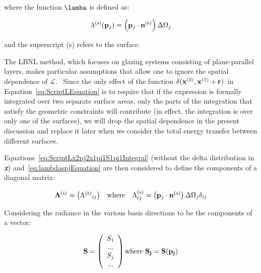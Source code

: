 where the function \(\lamba\) is defined as:

\begin{equation}
{\lambda ^{{\rm{(s)}}}}({{\bf{p}}_j}) = \left( {{{\bf{p}}_j}\cdot {{\bf{n}}^{{\rm{(s)}}}}} \right)\Delta {\Omega_j}
\label{eq:lambdaspjEquation}
\end{equation}

and the superscript (s) refers to the surface.

The LBNL method, which focuses on glazing systems consisting of plane-parallel layers, makes particular assumptions that allow one to ignore the spatial dependence of $\mathcal{L}$.~ Since the only effect of the function \(\delta ({{\bf{x}}^{{\rm{(2)}}}},{{\bf{x}}^{{\rm{(1)}}}} + {\bf{r}})\)~in Equation~\ref{eq:ScriptLEquation} is to require that if the expression is formally integrated over two separate surface areas, only the parts of the integration that satisfy the geometric constraints will contribute (in effect, the integration is over only one of the surfaces), we will drop the spatial dependence in the present discussion and replace it later when we consider the total energy transfer between different surfaces.

Equations~\ref{eq:ScriptLx2pj2x1pi1S1pi1Integral} (without the delta distribution in \textbf{\emph{x}}) and~\ref{eq:lambdaspjEquation} are then considered to define the components of a diagonal matrix:

\begin{equation}
\begin{array}{*{20}{c}}{{\bf{\Lambda }^{{\rm{(s)}}}} = \left( {{\Lambda ^{{\rm{(s)}}}}_{ij}} \right)}&{{\rm{where}}}&{\Lambda_{ij}^{{\rm{(s)}}} = \left( {{{\bf{p}}_j}\cdot {{\bf{n}}^{{\rm{(s)}}}}} \right)\Delta {\Omega_j}{\delta_{ij}}}\end{array}
\label{eq:LambdasEquation}
\end{equation}

Considering the radiance in the various basis directions to be the components of a vector:

\begin{equation}
\bf{S} = \left( 
    \begin{array}{c}
      S_1 \\ ... \\ S_j \\ ...
    \end{array}
  \right)
  \text{where~}
  S_j = S(\bf{p}_j)
\end{equation}

